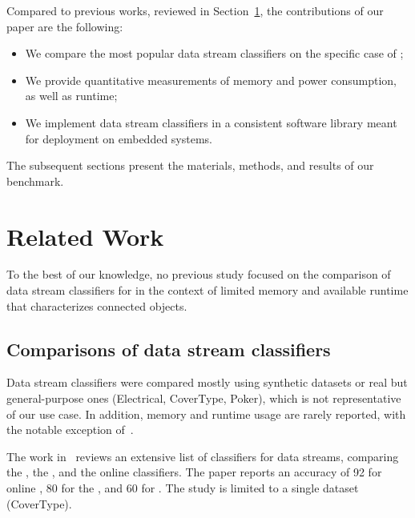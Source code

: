 Compared to previous works, reviewed in Section~\ref{sec:related-work}, the contributions of our paper are the following:
\begin{itemize}
    \item We compare the most popular data stream classifiers on the specific case of \har;
    \item We provide quantitative measurements of memory and power consumption, as well as runtime;
    \item We implement data stream classifiers in a consistent software library meant for deployment on embedded systems.
\end{itemize} 
The subsequent sections present the materials, methods, and results of our benchmark.


\section{Related Work}

\label{sec:related-work}

To the best of our knowledge, no previous study focused on the comparison
of data stream classifiers for \har in the context of limited memory and
available runtime that characterizes connected objects.

\subsection{Comparisons of data stream classifiers}

Data stream classifiers were compared mostly using synthetic datasets
or real but general-purpose ones (Electrical, CoverType, Poker), which is 
not representative of our use case. In addition, memory and runtime usage 
are rarely reported, with the notable exception of~\cite{StreamDM-CPP}.

The work
in~\cite{prasad2016stream} reviews an extensive list of classifiers for
data streams, comparing the \hoeffdingtree, the \naivebayes, and the \knn
online classifiers. The paper reports an accuracy of 92 for online \knn, 80
for the \hoeffdingtree, and 60 for \naivebayes. The study is limited to a
single dataset (CoverType). 

